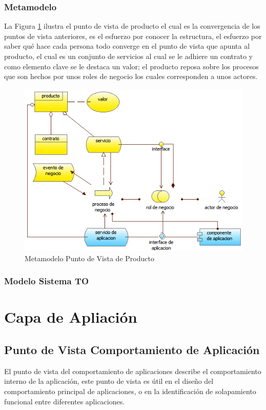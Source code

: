     \subsubsection{Metamodelo}
    La Figura \ref{metamodelo6} ilustra el punto de vista de producto el cual es la convergencia de los puntos de vista anteriores, es el esfuerzo por conocer la estructura, el  esfuerzo por saber qué hace cada persona todo converge en el punto de vista que apunta al producto, el cual es un conjunto de servicios al cual se le adhiere un contrato y   como elemento clave se le destaca un valor; el producto reposa sobre los procesos que son hechos por unos roles de negocio los cuales corresponden a unos actores. \cite{ref9}
    \begin{figure}[h]
      \centering
      \includegraphics{Imagenes/Metamodelos/06}
      \caption{Metamodelo Punto de Vista de Producto}
      \label{metamodelo6}
    \end{figure}
\subsubsection{Modelo Sistema TO}
\newpage  
  \section{Capa de Apliación}
    \subsection{Punto de Vista Comportamiento de Aplicación}
    El punto de vista del comportamiento de aplicaciones describe el comportamiento interno de la aplicación, este punto de vista es útil en el diseño del comportamiento principal de aplicaciones, o en la identificación de solapamiento funcional entre diferentes aplicaciones. \cite{ref9}
    
